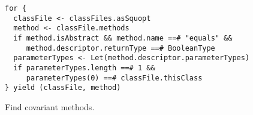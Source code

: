 \begin{figure}[htb]
\centering
\begin{lstlisting}
for {
  classFile <- classFiles.asSquopt
  method <- classFile.methods
  if method.isAbstract && method.name ==# "equals" &&
     method.descriptor.returnType ==# BooleanType
  parameterTypes <- Let(method.descriptor.parameterTypes)
  if parameterTypes.length ==# 1 &&
     parameterTypes(0) ==# classFile.thisClass
} yield (classFile, method)
\end{lstlisting}
\caption{Find covariant  methods.}
\label{fig:covariant-equals}
\end{figure}
